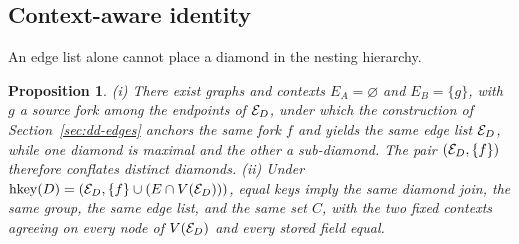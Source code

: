 \documentclass[12pt]{report}
\newtheorem{proposition}[theorem]{Proposition}
\begin{document}
\subsection{Context-aware identity}
\label{sec:dd-identity}

An edge list alone cannot place a diamond in the nesting hierarchy.

\begin{proposition}
\label{prop:identity}
(i) There exist graphs and contexts $E_A = \varnothing$ and $E_B = \{g\}$, with $g$ a source fork among the endpoints of $\mathcal{E}_D$, under which the construction of Section~\ref{sec:dd-edges} anchors the same fork $f$ and yields the same edge list $\mathcal{E}_D$, while one diamond is maximal and the other a sub-diamond. The pair $(\mathcal{E}_D, \{f\})$ therefore conflates distinct diamonds. (ii) Under $\mathrm{hkey}(D) = (\mathcal{E}_D, \{f\}\cup(E\cap V(\mathcal{E}_D)))$, equal keys imply the same diamond join, the same group, the same edge list, and the same set $C$, with the two fixed contexts agreeing on every node of $V(\mathcal{E}_D)$ and every stored field equal.
\end{proposition}
\end{document}
